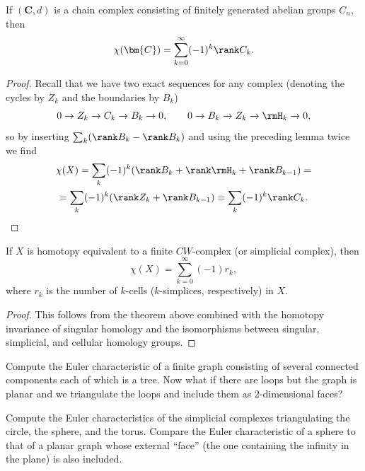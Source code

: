 \begin{thm}
    If $(\bm{C},d)$ is a chain complex consisting of finitely generated abelian groups $C_n$, then
    \[\chi(\bm{C})=\sum_{k=0}^\infty (-1)^k\rank C_k.\]
\end{thm}
\begin{proof}
    Recall that we have two exact sequences for any complex (denoting the cycles by $Z_k$ and the boundaries by $B_k$)
    \[0\to Z_k\to C_k\to B_k\to 0,\quad\quad 0\to B_k\to Z_k\to \rmH_k\to 0,\]
    so by inserting $\sum_k (\rank B_k-\rank B_k)$ and using the preceding lemma twice we find
    \begin{multline}
        \chi(X)=\sum_k(-1)^k(\rank B_k+\rank \rmH_k+\rank B_{k-1})=\\
        =\sum_k(-1)^k(\rank Z_k+\rank B_{k-1})=\sum_k (-1)^k\rank C_k.
    \end{multline}
\end{proof}
\begin{cor}
    If $X$ is homotopy equivalent to a finite $CW$-complex (or simplicial complex), then
    \[\chi(X)=\sum_{k=0}^\infty (-1)r_k,\]
    where $r_k$ is the number of $k$-cells ($k$-simplices, respectively) in $X$.
\end{cor}
\begin{proof}
    This follows from the theorem above combined with the homotopy invariance of singular homology and the isomorphisms between singular, simplicial, and cellular homology groups.
\end{proof}


\begin{xca}
    Compute the Euler characteristic of a finite graph consisting of several connected components each of which is a tree. Now what if there are loops but the graph is planar and we triangulate the loops and include them as 2-dimensional faces?
\end{xca}

\begin{xca}
    Compute the Euler characteristics of the simplicial complexes triangulating the circle, the sphere, and the torus. Compare the Euler characteristic of a sphere to that of a planar graph whose external ``face'' (the one containing the infinity in the plane) is also included.
\end{xca}



